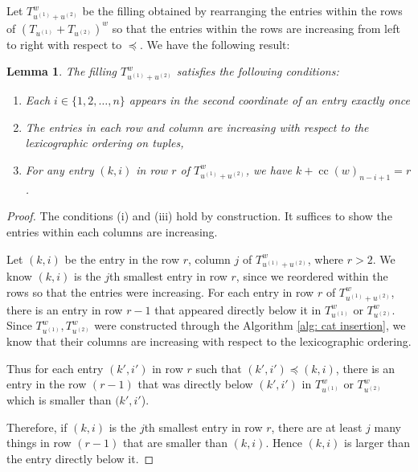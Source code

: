 \documentclass[10pt]{amsart}
\theoremstyle{plain}
\theoremstyle{definition}
\theoremstyle{plain}
\newtheorem{lemma}[lemma]{Lemma}
\theoremstyle{plain}
\theoremstyle{remark}
\theoremstyle{plain}
\theoremstyle{plain}
\DeclareMathOperator{\cc}{cc}
\begin{document}
Let $T^w_{u^{(1)}+ u^{(2)}}$ be the filling obtained by rearranging the entries within the rows of $(T_{u^{(1)}}+T_{u^{(2)}})^w$ so that the entries within the rows are increasing from left to right with respect to $\preceq$.
We have the following result:
\begin{lemma}\label{lemma:row column increase}
    The filling $T^w_{u^{(1)}+ u^{(2)}}$ satisfies the following conditions:

    \begin{enumerate}[label=(\roman*)]
        \item \label{cond: i} Each $i \in \{1,2,\dots, n\}$ appears in the second coordinate of an entry exactly once 
        \item \label{cond: ii}The entries in each row and column are increasing with respect to the lexicographic ordering on tuples,
        \item \label{cond: iii}For any entry $(k,i)$ in row $r$ of $T^w_{u^{(1)}+ u^{(2)}}$, we have $k + \cc(w)_{n-i+1} = r$.
\end{enumerate}
\end{lemma}
\begin{proof}
    The conditions (i) and (iii) hold by construction. It suffices to show the entries within each columns are increasing. 
    
    Let $(k,i)$ be the entry in the row $r$, column $j$ of $T^w_{u^{(1)}+ u^{(2)}}$, where $r>2$. We know $(k,i)$ is the $j$th smallest entry in row $r$, since we reordered within the rows so that the entries were increasing.
    For each entry in row $r$ of $T^w_{u^{(1)}+ u^{(2)}}$, there is an entry in row $r-1$ that appeared directly below it in $T^w_{u^{(1)}}$ or $T^w_{u^{(2)}}$. Since $T^w_{u^{(1)}}, T^w_{u^{(2)}}$ were constructed through the Algorithm \ref{alg: cat insertion}, we know that their columns are increasing with respect to the lexicographic ordering. 
    
    Thus for each entry $(k',i')$ in row $r$ such that $(k',i')\preceq (k,i)$, there is an entry in the row $(r-1)$ that was directly below $(k',i')$ in $T^w_{u^{(1)}}$ or $T^w_{u^{(2)}}$ which is smaller than $(k',i'$). 
    
    Therefore, if $(k,i)$ is the $j$th smallest entry in row $r$, there are at least $j$ many things in row $(r-1)$ that are smaller than $(k,i)$. Hence $(k,i)$ is larger than the entry directly below it.
\end{proof}
\end{document}
